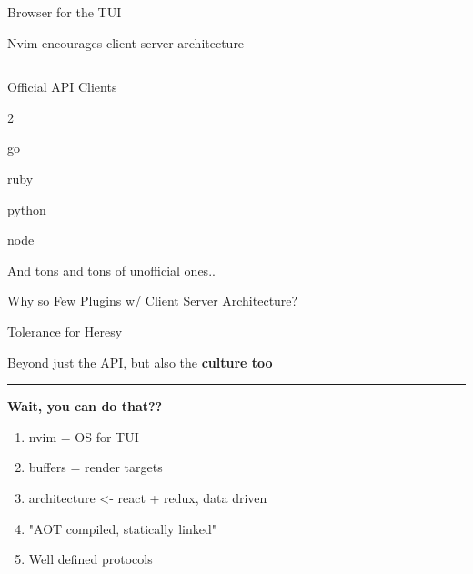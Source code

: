 \documentclass{beamer}
\begin{document}
\begin{frame}{Browser for the TUI}

	Nvim encourages client-server architecture

	\rule{\textwidth}{0.1em}

	\begin{block}{Official API Clients}

		\begin{itemize}


		\end{itemize}

	\end{block}

	And tons and tons of unofficial ones..

\end{frame}


\begin{frame}{Why so Few Plugins w/ Client Server Architecture?}


\end{frame}


\begin{frame}{Tolerance for Heresy}

	Beyond just the API, but also the \textbf{culture too}

	\rule{\textwidth}{0.1em}

	\textbf{Wait, you can do that??}

	\begin{enumerate}

		\item nvim = OS for TUI

		\item buffers = render targets

		\item architecture <- react + redux, data driven

		\item "AOT compiled, statically linked"

		\item Well defined protocols

	\end{enumerate}

\end{frame}
\end{document}

